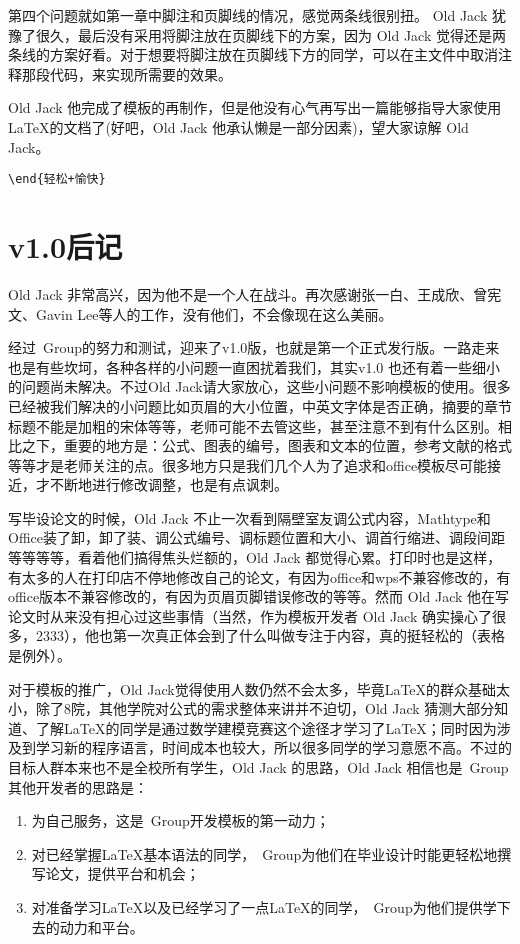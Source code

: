 第四个问题就如第一章中脚注和页脚线的情况，感觉两条线很别扭。 Old Jack 犹豫了很久，最后没有采用将脚注放在页脚线下的方案，因为 Old Jack 觉得还是两条线的方案好看。对于想要将脚注放在页脚线下方的同学，可以在主文件中取消注释那段代码，来实现所需要的效果。

Old Jack 他完成了模板的再制作，但是他没有心气再写出一篇能够指导大家使用\LaTeX 的文档了(好吧，Old Jack 他承认懒是一部分因素)，望大家谅解 Old Jack。

\verb!\end{轻松+愉快}!

\section{v1.0后记}

Old Jack 非常高兴，因为他不是一个人在战斗。再次感谢张一白、王成欣、曾宪文、Gavin Lee等人的工作，没有他们，\nuaathesis 不会像现在这么美丽。

经过\nuaathesis~Group的努力和测试，\nuaathesis 迎来了v1.0版，也就是第一个正式发行版。一路走来也是有些坎坷，各种各样的小问题一直困扰着我们，其实v1.0 也还有着一些细小的问题尚未解决。不过Old Jack请大家放心，这些小问题不影响模板的使用。很多已经被我们解决的小问题比如页眉的大小位置，中英文字体是否正确，摘要的章节标题不能是加粗的宋体等等，老师可能不去管这些，甚至注意不到有什么区别。相比之下，重要的地方是：公式、图表的编号，图表和文本的位置，参考文献的格式等等才是老师关注的点。很多地方只是我们几个人为了追求和office模板尽可能接近，才不断地进行修改调整，也是有点讽刺。

写毕设论文的时候，Old Jack 不止一次看到隔壁室友调公式内容，Mathtype和Office装了卸，卸了装、调公式编号、调标题位置和大小、调首行缩进、调段间距等等等等，看着他们搞得焦头烂额的，Old Jack 都觉得心累。打印时也是这样，有太多的人在打印店不停地修改自己的论文，有因为office和wps不兼容修改的，有office版本不兼容修改的，有因为页眉页脚错误修改的等等。然而 Old Jack 他在写论文时从来没有担心过这些事情（当然，作为模板开发者 Old Jack 确实操心了很多，2333），他也第一次真正体会到了什么叫做专注于内容，真的挺轻松的（表格是例外）。

对于模板的推广，Old Jack觉得使用人数仍然不会太多，毕竟\LaTeX 的群众基础太小，除了8院，其他学院对公式的需求整体来讲并不迫切，Old Jack 猜测大部分知道、了解\LaTeX 的同学是通过数学建模竞赛这个途径才学习了\LaTeX ；同时因为涉及到学习新的程序语言，时间成本也较大，所以很多同学的学习意愿不高。不过\nuaathesis 的目标人群本来也不是全校所有学生，Old Jack 的思路，Old Jack 相信也是\nuaathesis~Group其他开发者的思路是：
\begin{enumerate}
  \item 为自己服务，这是\nuaathesis~Group开发模板的第一动力；
  \item 对已经掌握\LaTeX 基本语法的同学，\nuaathesis~Group为他们在毕业设计时能更轻松地撰写论文，提供平台和机会；
  \item 对准备学习\LaTeX 以及已经学习了一点\LaTeX 的同学，\nuaathesis~Group为他们提供学下去的动力和平台。
\end{enumerate}


